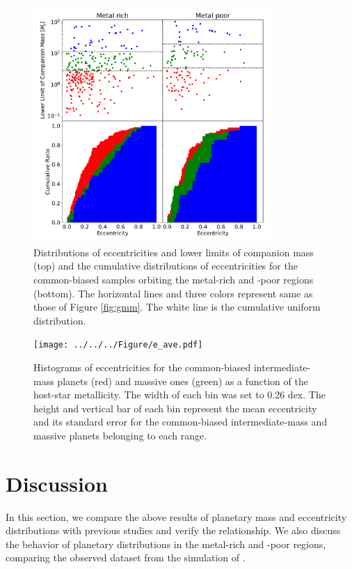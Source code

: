 \documentclass[twocolumn, dvipdfmx]{aastex62}
\begin{document}
\begin{CJK*}{UTF8}{min}
\begin{figure}[t]
\begin{center}
\includegraphics[width=9cm]{../../../Figure/e_Mp_merge.pdf}
\caption{Distributions of eccentricities and lower limits of companion mass (top) and the cumulative distributions of eccentricities for the common-biased samples orbiting the metal-rich and -poor regions (bottom). The horizontal lines and three colors represent same as those of Figure \ref{fig:gmm}. The white line is the cumulative uniform distribution. \label{fig:e_Mp}}
\end{center}
\end{figure}

\begin{figure}[t]
\begin{center}
\texttt{[image: ../../../Figure/e\_ave.pdf]}
\caption{Histograms of eccentricities for the common-biased intermediate-mass planets (red) and massive ones (green) as a function of the host-star metallicity. The width of each bin was set to 0.26 dex. The height and vertical bar of each bin represent the mean eccentricity and its standard error for the common-biased intermediate-mass and massive planets belonging to each range. \label{fig:e_ave}}
\end{center}
\end{figure}


\section{Discussion} \label{sec:discussion}

In this section, we compare the above results of planetary mass and eccentricity distributions with previous studies and verify the relationship. We also discuss the behavior of planetary distributions in the metal-rich and -poor regions, comparing the observed dataset from the simulation of \cite{2012A&A...541A..97M}.



\end{CJK*}
\end{document}
